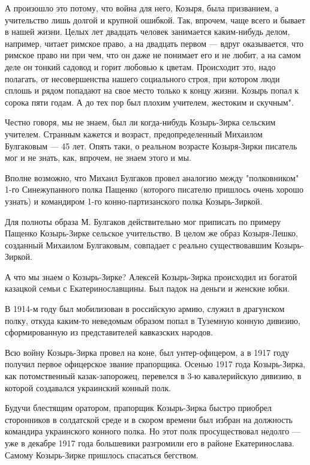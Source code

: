 А произошло это потому, что война для него, Козыря, была призванием, а
учительство лишь долгой и крупной ошибкой. Так, впрочем, чаще всего и
бывает в нашей жизни. Целых лет двадцать человек занимается каким-нибудь
делом, например, читает римское право, а на двадцать первом — вдруг
оказывается, что римское право ни при чем, что он даже не понимает его и
не любит, а на самом деле он тонкий садовод и горит любовью к цветам.
Происходит это, надо полагать, от несовершенства нашего социального строя,
при котором люди сплошь и рядом попадают на свое место только к концу
жизни. Козырь попал к сорока пяти годам. А до тех пор был плохим учителем,
жестоким и скучным".

Честно говоря, мы не знаем, был ли когда-нибудь Козырь-Зирка сельским учителем.
Странным кажется и возраст, предопределенный Михаилом Булгаковым — 45 лет.
Опять таки, о реальном возрасте Козыря-Зирки писатель мог и не знать, как,
впрочем, не знаем этого и мы. 

Вполне возможно, что Михаил Булгаков провел аналогию между "полковником"
1-го Синежупанного полка Пащенко (которого писателю пришлось очень хорошо
узнать) и командиром 1-го конно-партизанского полка Козырь-Зиркой. 

Для полноты образа М. Булгаков действительно мог приписать по примеру
Пащенко Козырь-Зирке сельское учительство. В целом же образ Козыря-Лешко,
созданный Михаилом Булгаковым, совпадает с реально существовавшим
Козырь-Зиркой.

А что мы знаем о Козырь-Зирке? Алексей Козырь-Зирка происходил из богатой
казацкой семьи с Екатеринославщины. Был падок на деньги и женские юбки. 

В 1914-м году был мобилизован в российскую армию, служил в драгунском полку,
откуда каким-то неведомым образом попал в Туземную конную дивизию,
сформированную из представителей кавказских народов. 

Всю войну Козырь-Зирка провел на коне, был унтер-офицером, а в 1917 году
получил первое офицерское звание прапорщика. Осенью 1917 года Козырь-Зирка,
как потомственный казак-запорожец, перевелся в 3-ю кавалерийскую дивизию, в
которой создавался украинский конный полк. 

Будучи блестящим оратором, прапорщик Козырь-Зирка быстро приобрел
сторонников в солдатской среде и в скором времени был избран на должность
командира украинского конного полка. Но этот полк просуществовал недолго —
уже в декабре 1917 года большевики разгромили его в районе Екатеринослава.
Самому Козырь-Зирке пришлось спасаться бегством. 

